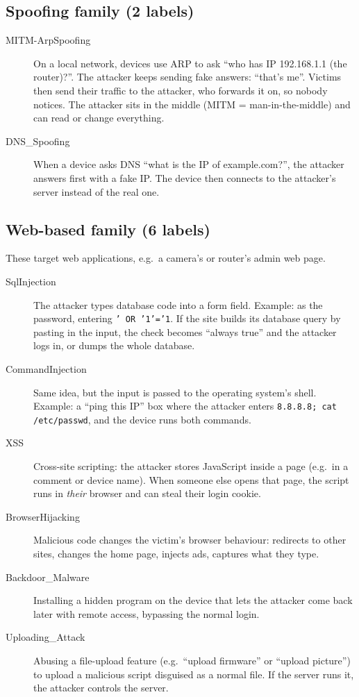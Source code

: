 \documentclass[11pt]{article}
\begin{document}
\subsection*{Spoofing family (2 labels)}
\begin{description}
\item[MITM-ArpSpoofing] On a local network, devices use ARP to ask ``who has IP 192.168.1.1 (the router)?''. The attacker keeps sending fake answers: ``that's me''. Victims then send their traffic to the attacker, who forwards it on, so nobody notices. The attacker sits in the middle (MITM = man-in-the-middle) and can read or change everything.
\item[DNS\_Spoofing] When a device asks DNS ``what is the IP of example.com?'', the attacker answers first with a fake IP. The device then connects to the attacker's server instead of the real one.
\end{description}

\subsection*{Web-based family (6 labels)}
These target web applications, e.g.\ a camera's or router's admin web page.
\begin{description}
\item[SqlInjection] The attacker types database code into a form field. Example: as the password, entering \texttt{' OR '1'='1}. If the site builds its database query by pasting in the input, the check becomes ``always true'' and the attacker logs in, or dumps the whole database.
\item[CommandInjection] Same idea, but the input is passed to the operating system's shell. Example: a ``ping this IP'' box where the attacker enters \texttt{8.8.8.8; cat /etc/passwd}, and the device runs both commands.
\item[XSS] Cross-site scripting: the attacker stores JavaScript inside a page (e.g.\ in a comment or device name). When someone else opens that page, the script runs in \emph{their} browser and can steal their login cookie.
\item[BrowserHijacking] Malicious code changes the victim's browser behaviour: redirects to other sites, changes the home page, injects ads, captures what they type.
\item[Backdoor\_Malware] Installing a hidden program on the device that lets the attacker come back later with remote access, bypassing the normal login.
\item[Uploading\_Attack] Abusing a file-upload feature (e.g.\ ``upload firmware'' or ``upload picture'') to upload a malicious script disguised as a normal file. If the server runs it, the attacker controls the server.
\end{description}
\end{document}
